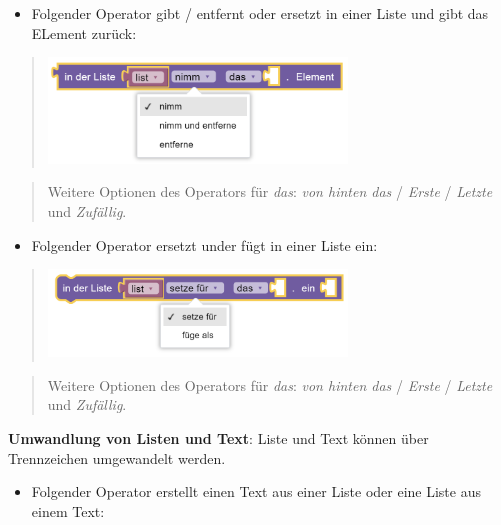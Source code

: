 \documentclass[
  letterpaper,
  DIV=11]{scrreprt}
\providecommand{\tightlist}{%
  \setlength{\itemsep}{0pt}\setlength{\parskip}{0pt}}\usepackage{longtable,booktabs,array}
\begin{document}
\begin{tcolorbox}
\begin{itemize}
\tightlist
\item
  Folgender Operator gibt / entfernt oder ersetzt in einer Liste und
  gibt das ELement zurück:
\end{itemize}

\begin{quote}
\includegraphics[width=3.125in,height=\textheight]{img/screenshot-blockly-element-replace-in-list-01-DEU.png}
\end{quote}

\begin{quote}
Weitere Optionen des Operators für \emph{das}: \emph{von hinten das} /
\emph{Erste} / \emph{Letzte} und \emph{Zufällig}.
\end{quote}

\begin{itemize}
\tightlist
\item
  Folgender Operator ersetzt under fügt in einer Liste ein:
\end{itemize}

\begin{quote}
\includegraphics[width=3.125in,height=\textheight]{img/screenshot-blockly-element-modify-list-01-DEU.png}
\end{quote}

\begin{quote}
Weitere Optionen des Operators für \emph{das}: \emph{von hinten das} /
\emph{Erste} / \emph{Letzte} und \emph{Zufällig}.
\end{quote}

\textbf{Umwandlung von Listen und Text}: Liste und Text können über
Trennzeichen umgewandelt werden.

\begin{itemize}
\tightlist
\item
  Folgender Operator erstellt einen Text aus einer Liste oder eine Liste
  aus einem Text:
\end{itemize}


\end{tcolorbox}
\end{document}
